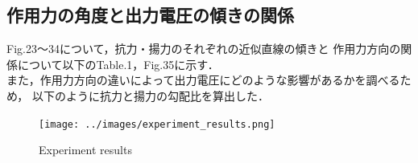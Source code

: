 \documentclass[twocolumn,a4j]{jsarticle}
\begin{document}
\newpage
\;
\newpage
\;
\newpage

\subsection{作用力の角度と出力電圧の傾きの関係}

Fig.23～34について，抗力・揚力のそれぞれの近似直線の傾きと
作用力方向の関係について以下のTable.1，Fig.35に示す．\\
また，作用力方向の違いによって出力電圧にどのような影響があるかを調べるため，
以下のように抗力と揚力の勾配比を算出した．\\


\begin{figure}[htbp]
    \footnotesize
    \begin{center}
        \texttt{[image: ../images/experiment\_results.png]}
        \caption{Experiment results}
    \end{center}
\end{figure}
\end{document}
